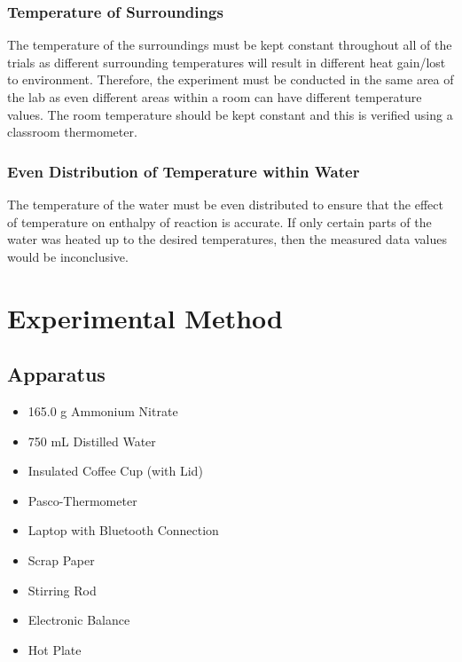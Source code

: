 \documentclass{article}
\begin{document}
\subsubsection{Temperature of Surroundings}
The temperature of the surroundings must be kept constant throughout all of the trials as different surrounding temperatures will result in different heat gain/lost to environment. Therefore, the experiment must be conducted in the same area of the lab as even different areas within a room can have different temperature values. The room temperature should be kept constant and this is verified using a classroom thermometer.

\subsubsection{Even Distribution of Temperature within Water}
The temperature of the water must be even distributed to ensure that the effect of temperature on enthalpy of reaction is accurate. If only certain parts of the water was heated up to the desired temperatures, then the measured data values would be inconclusive.

\section{Experimental Method}
\subsection{Apparatus}
\begin{itemize}
    \item 165.0 g Ammonium Nitrate 
    \item 750 mL Distilled Water
    \item Insulated Coffee Cup (with Lid)
    \item Pasco-Thermometer
    \item Laptop with Bluetooth Connection
    \item Scrap Paper
    \item Stirring Rod
    \item Electronic Balance 
    \item Hot Plate
\end{itemize}
\end{document}
